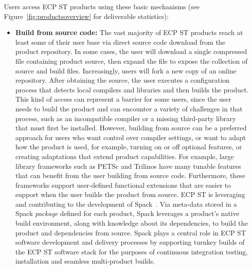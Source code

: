 Users access ECP ST products using these basic mechanisms (see Figure~\ref{fig:productsoverview} for deliverable statistics):
\begin{itemize}
	\item \textbf{Build from source code:} The vast majority of ECP ST products reach at least some of their user base via direct source code download from the product repository.  In some cases, the user will download a single compressed file containing product source, then expand the file to expose the collection of source and build files.  Increasingly, users will fork a new copy of an online repository.  After obtaining the source, the user executes a configuration process that detects local compilers and libraries and then builds the product.  This kind of access can represent a barrier for some users, since the user needs to build the product and can encounter a variety of challenges in that process, such as an incompatible compiler or a missing third-party library that must first be installed.  However, building from source can be a preferred approach for users who want control over compiler settings, or want to adapt how the product is used, for example, turning on or off optional features, or creating adaptations that extend product capabilities.  For example, large library frameworks such as PETSc and Trilinos have many tunable features that can benefit from the user building from source code.  Furthermore, these frameworks support user-defined functional extensions that are easier to support when the user builds the product from source.  ECP ST is leveraging and contributing to the development of Spack~\cite{gamblin+:sc15}.  Via meta-data stored in a Spack \textit{package} defined for each product, Spack leverages a product's native build environment, along with knowledge about its dependencies, to build the product and dependencies from source.  Spack plays a central role in ECP ST software development and delivery processes by supporting turnkey builds of the ECP ST software stack for the purposes of continuous integration testing, installation and seamless multi-product builds.

\end{itemize}
